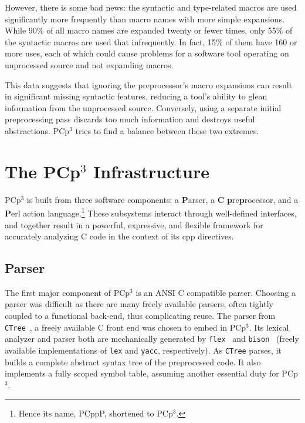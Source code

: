 \documentclass{article}
\newcommand{\pcp}{\mbox{\textsf{PCp}$^3$}}
\newcommand{\pcppp}{\mbox{\textsf{PCppP}}}
\newcommand{\Cpp}{\mbox{\textsf{cpp}}}
\newcommand{\C}{\mbox{C}}
\begin{document}
However, there is some bad news: the syntactic and type-related macros
are used significantly more frequently than macro names with more simple
expansions.  While 90\% of all macro names are expanded twenty or fewer
times, only 55\% of the syntactic macros are used that infrequently.  In
fact, 15\% of them have 160 or more uses, each of which could cause
problems for a software tool operating on unprocessed source and not
expanding macros.

This data suggests that ignoring the preprocessor's macro expansions can
result in significant missing syntactic features, reducing a tool's
ability to glean information from the unprocessed source.  Conversely,
using a separate initial preprocessing pass discards too much
information and destroys useful abstractions.  \pcp{} tries to find a balance
between these two extremes.



\section{The \pcp{} Infrastructure}
\label{sec:pcp3}
\pcp{} is built from three software components: a \textbf{\textsf{P}}arser, a \textbf{\textsf{C}}
\textbf{\textsf{p}}re\textbf{\textsf{p}}rocessor, and a \textbf{\textsf{P}}erl action
language.\footnote{Hence its name, \pcppp{}, shortened to \pcp{}.}
These subsystems interact through well-defined interfaces, and together
result in a powerful, expressive, and flexible framework for accurately
analyzing \C{} code in the context of its \Cpp{} directives.

\subsection{Parser}

The first major component of \pcp{} is an ANSI \C{} compatible parser.
Choosing a parser was difficult as there are many freely available
parsers, often tightly coupled to a functional back-end, thus complicating
reuse.  The parser from \texttt{CTree}~\cite{CTree}, a freely available
\C{} front end was chosen to embed in \pcp{}.  Its lexical analyzer and
parser both are mechanically generated by
\texttt{flex}~\cite{Flex,Levine92} and
\texttt{bison}~\cite{Bison,Levine92} (freely available implementations
of \texttt{lex} and \texttt{yacc}, respectively).  
As \texttt{CTree} parses, it builds a complete abstract syntax tree of
the preprocessed code.  It also implements a fully scoped symbol table,
assuming another essential duty for \pcp{}.
\end{document}
